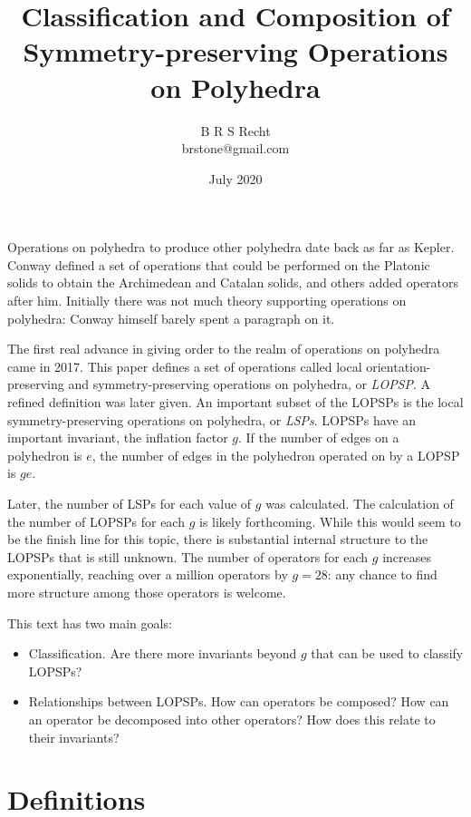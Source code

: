 \documentclass[12pt]{amsart}%
\title{Classification and Composition of Symmetry-preserving Operations on Polyhedra}
\author{B R S Recht \\
        brstone@gmail.com}
\date{July 2020}
\begin{document}
\maketitle

Operations on polyhedra to produce other polyhedra date back as far as Kepler.
Conway defined a set of operations that could be performed on the Platonic
solids to obtain the Archimedean and Catalan solids, and others added operators
after him. Initially there was not much theory supporting operations on
polyhedra: Conway himself barely spent a paragraph on it.\cite{conway}

The first real advance in giving order to the realm of operations on polyhedra
came in 2017. This paper defines a set of operations called local
orientation-preserving and symmetry-preserving operations on polyhedra, or
\textit{LOPSP}.\cite{brinkmann} A refined definition was later
given.\cite{goetschalckx2020} An important subset of the LOPSPs is the local
symmetry-preserving operations on polyhedra, or \textit{LSPs}. LOPSPs have an important
invariant, the inflation factor $g$. If the number of edges on a polyhedron is
$e$, the number of edges in the polyhedron operated on by a LOPSP is $ge$.

Later, the number of LSPs for each value of $g$ was
calculated.\cite{goetschalckx2019} The calculation of the number of LOPSPs for
each $g$ is likely forthcoming. While this would seem to be the finish line for
this topic, there is substantial internal structure to the LOPSPs that is still
unknown. The number of operators for each $g$ increases exponentially, reaching
over a million operators by $g = 28$: any chance to find more structure among
those operators is welcome.

This text has two main goals:
\begin{itemize}
  \item Classification. Are there more invariants beyond $g$ that can be used
  to classify LOPSPs?
  \item Relationships between LOPSPs. How can operators be composed? How can
  an operator be decomposed into other operators? How does this relate to their
  invariants?
\end{itemize}

\section{Definitions}
\end{document}
